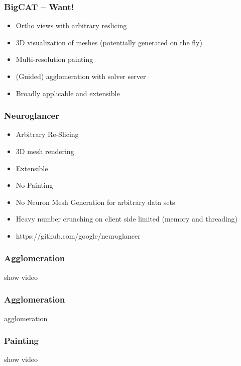 \documentclass[aspectratio=169]{beamer}
\begin{document}
\begin{frame}
    \frametitle{BigCAT -- Want!}
    \begin{itemize}
          \item Ortho views with arbitrary reslicing
          \item 3D visualization of meshes (potentially generated on the fly)
          \item Multi-resolution painting
          \item (Guided) agglomeration with solver server
          \item Broadly applicable and extensible
    \end{itemize}
\end{frame} 

\begin{frame}
    \frametitle{Neuroglancer}
    \begin{itemize}
          \item Arbitrary Re-Slicing
          \item 3D mesh rendering
          \item Extensible
          \item No Painting
          \item No Neuron Mesh Generation for arbitrary data sets 
          \item Heavy number crunching on client side limited (memory and threading) 
          \item https://github.com/google/neuroglancer
    \end{itemize}
\end{frame}

\begin{frame}
    \frametitle{Agglomeration}
    show video
\end{frame}

\begin{frame}
    \frametitle{Agglomeration}
    {agglomeration}
\end{frame}

\begin{frame}
    \frametitle{Painting}
    show video
\end{frame}
\end{document}
